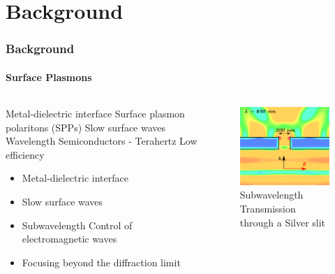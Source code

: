\documentclass[mathserif,16pt,xcolor=table]{beamer}
\begin{document}
\section{Background}
\begin{frame}
  \frametitle{Background}
  \framesubtitle{Surface Plasmons}

  \begin{columns} %
    \begin{column}{.5\textwidth}
      \begin{minipage}[T][.1\textheight][c]{\linewidth}
        \begin{outline}[itemize]
          \1 Metal-dielectric interface
          \1 Surface plasmon polaritons (SPPs)
          \1 Slow surface waves
            \2 Wavelength
            \2 Semiconductors - Terahertz
          \1 Low efficiency
        \end{outline}
        \begin{itemize}
          \item Metal-dielectric interface
        \end{itemize}
        \begin{itemize}
          \item Slow surface waves
          \item Subwavelength Control of electromagnetic waves
          \item Focusing beyond the diffraction limit
        \end{itemize}
      \end{minipage}
    \end{column}
    \begin{column}{.5\textwidth}
      \begin{figure}
        \includegraphics[scale=.3]{E_squared_final.png}
        \caption{Subwavelength Transmission through a Silver slit}
      \end{figure}
      \end{column}%
    \end{columns}
  \end{frame}
\end{document}
